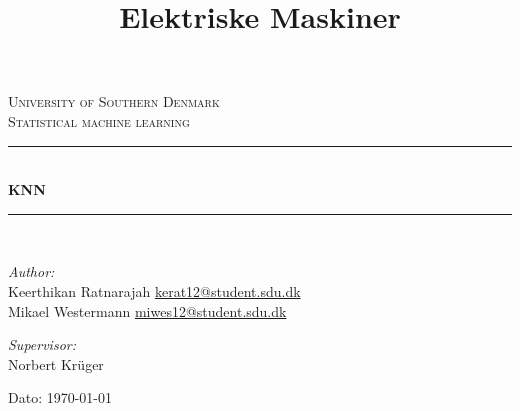 \documentclass[11pt]{report}
\title{Elektriske Maskiner}
\begin{document}
\begin{titlepage}
\begin{center}


\textsc{\LARGE University of Southern Denmark}\\[1.5cm]
\textsc{\Large Statistical machine learning}\\[0.5cm]
\vfill
\hrule ~\\[0.3cm]
{ \huge \bfseries KNN\\[0.4cm] }
\hrule ~\\[1.5cm]
\vfill

\noindent
\begin{minipage}{0.4\textwidth}
\begin{flushleft} \large
\emph{Author:}\\
Keerthikan Ratnarajah
\url{kerat12@student.sdu.dk}\\
Mikael Westermann
\url{miwes12@student.sdu.dk}
\end{flushleft}
\end{minipage}%
\begin{minipage}{0.4\textwidth}
\begin{flushright} \large
\emph{Supervisor:}\\
Norbert Kr\"{u}ger 
\end{flushright}
\end{minipage}

\vspace{1.2cm}
Dato: \today


\end{center}
\end{titlepage}

\tableofcontents

\newpage










\end{document}
